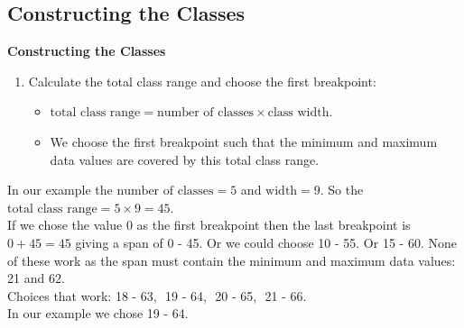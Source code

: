 \documentclass[compress]{beamer}        %
\makeatletter
\newcommand{\tcb}{\textcolor{beamer@blendedblue}}
\makeatother
\begin{document}
\subsection{Constructing the Classes}
\begin{frame}{\bf \tcb{Constructing the Classes}}
\begin{enumerate}[3.]
\item Calculate the total class range and choose the first breakpoint:
\begin{itemize}\itemsep0.3cm
\item $\text{total class range} = \text{number of classes} \times \text{class width}$.
\item We choose the first breakpoint such that the minimum and maximum data values are covered by this total class range.
\end{itemize}
\end{enumerate}

In our example the $\text{number of classes} = 5$ and $\text{width} = 9$. So the $\text{total class range} = 5 \times 9 = 45$.\\[0.2cm]
If we chose the value $0$ as the first breakpoint then the last breakpoint is $0 + 45 = 45$ giving a span of 0 - 45. Or we could choose 10 - 55. Or 15 - 60. None of these work as the span must contain the minimum and maximum data values: 21 and 62.\\[0.5cm]
Choices that work: 18 - 63,\,\, 19 - 64,\,\, 20 - 65,\,\, 21 - 66.\\[0.4cm]
In our example we chose 19 - 64.

\end{frame}
\end{document}
